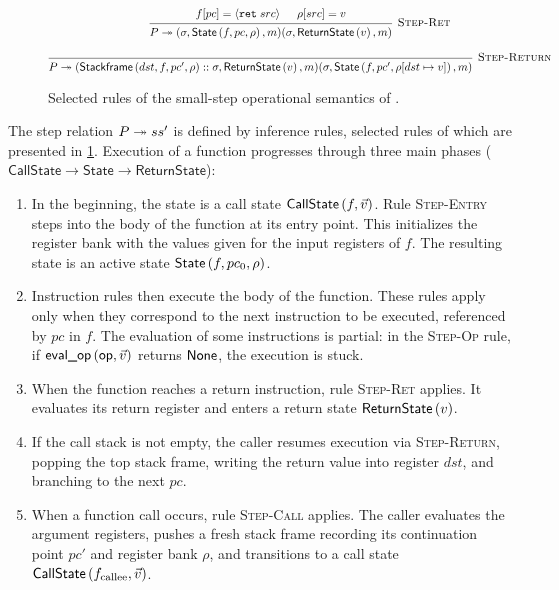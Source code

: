 \documentclass[report.tex]{subfiles}
\begin{document}
\begin{figure}[htb]
\begin{gather*}
    \begin{prooftree}
      \hypo{\pcatis{f}{pc}{\Iret{src}}}
      \hypo{\getreg{src}{\rho} = v}
      \infer2[\textsc{Step-Ret}]{
        \step{P}{
          (\sigma, \State{f}{pc}{\rho}, m)
        }{
          (\sigma, \ReturnState{v}, m)
        }
      }
    \end{prooftree}
    \\[1em]
    \begin{prooftree}
      \infer0[\textsc{Step-Return}]{
        \step{P}{
          (\Stackframe{dst}{f}{pc'}{\rho} :: \sigma, \ReturnState{v}, m)
        }{
          (\sigma, \State{f}{pc'}{\setreg{dst}{v}{\rho}}, m)
        }
      }
    \end{prooftree}
  \end{gather*}
  \caption{Selected rules of the small-step operational semantics of \muRTL{}.}
  \label{fig:rtl-semantics}
\end{figure}

The step relation $\step{P}{s}{s'}$ is defined by inference rules,
selected rules of which are presented in \cref{fig:rtl-semantics}.
Execution of a function progresses through three main phases
($\textsf{CallState} \to \textsf{State} \to \textsf{ReturnState}$):
\begin{enumerate}
  \item In the beginning,
        the state is a call state $\textsf{CallState}\left(f, \vec{v}\right)$.
        Rule \textsc{Step-Entry} steps into the body of the function
        at its entry point.
        This initializes the register bank with the values given for the input
        registers of $f$.
        The resulting state is an active state $\textsf{State}\left(f, pc_0, \rho\right)$.

  \item Instruction rules then execute the body of the function.
        These rules apply only when they correspond to the next instruction
        to be executed,
        referenced by $pc$ in $f$.
        The evaluation of some instructions is partial:
        in the \textsc{Step-Op} rule,
        if $\textsf{eval\_op}\left(\textsf{op}, \vec{v}\right)$ returns $\textsf{None}$,
        the execution is stuck.

  \item When the function reaches a return instruction,
        rule \textsc{Step-Ret} applies.
        It evaluates its return register and enters a return state
        $\textsf{ReturnState}\left(v\right)$.

  \item If the call stack is not empty,
        the caller resumes execution via \textsc{Step-Return},
        popping the top stack frame,
        writing the return value into register $dst$,
        and branching to the next $pc$.

  \item When a function call occurs,
        rule \textsc{Step-Call} applies.
        The caller evaluates the argument registers,
        pushes a fresh stack frame recording its continuation point $pc'$ and
        register bank $\rho$,
        and transitions to a call state $\textsf{CallState}\left(f_{\text{callee}}, \vec{v}\right)$.
\end{enumerate}
\end{document}
